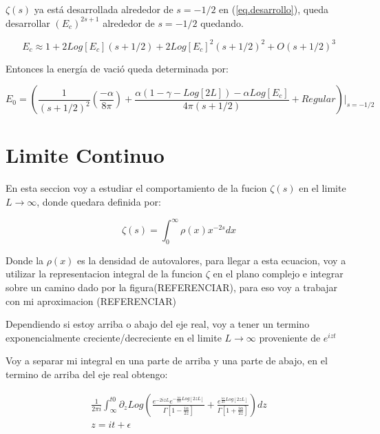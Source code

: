 $\zeta (s)$ ya está desarrollada alrededor de $s=-1/2$ en (\ref{eq.desarrollo}), queda desarrollar $(E_c) ^{2s+1} $ alrededor de $s=-1/2$ quedando.

\begin{equation}
    E _c \approx 
    1 + 2 Log[E_c] (s + 1/2) +
    2 Log[E_c] ^2 (s+1/2) ^2 + 
    O (s+1/2)^3
\end{equation}

Entonces la energía de vació queda determinada por:

\begin{equation}
    E _0 =
    \left(
    \frac{1}{(s+1/2)^2} 
    \left(
    \frac{- \alpha}{8 \pi}
    \right)+
    \frac{
    \alpha(1 -\gamma-Log[2L]) - 
    \alpha Log[E_c] 
    }{4 \pi (s+1/2)} 
     + Regular
    \right) | _{s=-1/2}
\end{equation}


\chapter{Limite Continuo}

En esta seccion voy a estudiar el comportamiento de la fucion $\zeta (s) $ en el limite $L \rightarrow \infty$, donde quedara definida por:

\begin{equation}
\zeta (s) = \int _{0} ^{\infty} \rho (x) x^{-2 s} dx
\end{equation}

Donde la $\rho(x) $ es la densidad de autovalores, para llegar a esta ecuacion, voy a utilizar la representacion integral de la funcion $\zeta$ en el plano complejo e integrar sobre un camino dado por la figura(REFERENCIAR), para eso voy a trabajar con mi aproximacion (REFERENCIAR)



Dependiendo si estoy arriba o abajo del eje real, voy a tener un termino exponencialmente creciente/decreciente en el limite $L \rightarrow \infty$ proveniente de $e ^{i z t}$

Voy a separar mi integral en una parte de arriba y una parte de abajo, en el termino de arriba del eje real obtengo:

\begin{equation}
\begin{array}{c}
\frac{1}{2 \pi i} \int _{\infty} ^{t0} 
\partial _z
Log
\left(
\frac{e ^{-2 i z  L } e ^{- \frac{i \alpha}{2 \lambda} Log[2 z  L]} }{\Gamma[1-\frac{i \alpha}{2 z }]} +
\frac{e ^{ \frac{i \alpha}{2 z } Log[2 z  L]} }{\Gamma[1+\frac{i \alpha}{2 z }]}
\right) d z \\
z = i t + \epsilon 
\end{array}
\end{equation}

